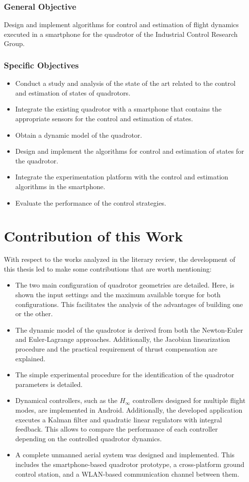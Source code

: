 \subsubsection{General Objective}
Design and implement algorithms for control and estimation of flight dynamics executed in a smartphone for the quadrotor of the Industrial Control Research Group.
\subsubsection{Specific Objectives}
\begin{itemize}
\item Conduct a study and analysis of the state of the art related to the control and estimation of states of quadrotors.
\item Integrate the existing quadrotor with a smartphone that contains the appropriate sensors for the control and estimation of states.
\item Obtain a dynamic model of the quadrotor.
\item Design and implement the algorithms for control and estimation of states for the quadrotor.
\item Integrate the experimentation platform with the control and estimation algorithms in the smartphone.
\item Evaluate the performance of the control strategies.%
\end{itemize}

\section{Contribution of this Work}
With respect to the works analyzed in the literary review, the development of this thesis led to make some contributions that are worth mentioning:
\begin{itemize}
\item The two main configuration of quadrotor geometries are detailed. Here, is shown the input settings and the maximum available torque for both configurations. This facilitates the analysis of the advantages of building one or the other.
\item The dynamic model of the quadrotor is derived from both the Newton-Euler and Euler-Lagrange approaches. Additionally, the Jacobian linearization procedure and the practical requirement of thrust compensation are explained. 
\item The simple experimental procedure for the identification of the quadrotor parameters is detailed.
\item Dynamical controllers, such as the $H_\infty$ controllers designed for multiple flight modes, are implemented in Android. Additionally, the developed application executes a Kalman filter and quadratic linear regulators with integral feedback. This allows to compare the performance of each controller depending on the controlled quadrotor dynamics.
\item A complete unmanned aerial system was designed and implemented. This includes the smartphone-based quadrotor prototype, a cross-platform ground control station, and a WLAN-based communication channel between them.
\end{itemize}


